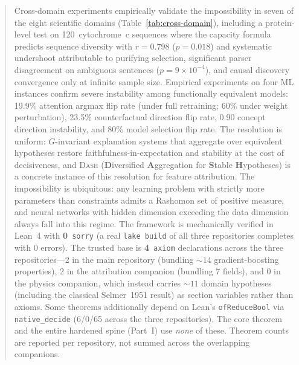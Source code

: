 \documentclass[11pt,a4paper]{article}
\newcommand{\DASH}{\textsc{Dash}}
\begin{document}
\begin{abstract}
Cross-domain experiments empirically validate the impossibility in seven of
the eight scientific domains (Table~\ref{tab:cross-domain}), including a
protein-level test on 120~cytochrome~c sequences where the capacity
formula predicts sequence diversity with $r = 0.798$ ($p = 0.018$) and
systematic undershoot attributable to purifying selection,
significant parser disagreement on ambiguous sentences
($p = 9 \times 10^{-4}$), and causal discovery convergence only at infinite
sample size.
Empirical experiments on four ML instances confirm severe instability among
functionally equivalent models: 19.9\% attention argmax flip rate
(under full retraining; 60\% under weight perturbation), 23.5\%
counterfactual direction flip rate, 0.90 concept direction instability,
and 80\% model selection flip rate.
The resolution is uniform: $G$-invariant explanation systems that aggregate
over equivalent hypotheses restore faithfulness-in-expectation and stability at
the cost of decisiveness, and \DASH{} (\textbf{D}iversified \textbf{A}ggregation for
\textbf{S}table \textbf{H}ypotheses) is a concrete instance of this resolution for feature attribution.
The impossibility is ubiquitous: any learning problem with strictly more
parameters than constraints admits a Rashomon set of positive measure, and
neural networks with hidden dimension exceeding the data dimension always fall
into this regime.
The framework is mechanically verified in Lean~4 with \textbf{0}~\texttt{sorry}
(a real \texttt{lake build} of all three repositories completes with 0 errors).
The trusted base is \textbf{4}~\texttt{axiom} declarations across the three
repositories---2 in the main repository (bundling ${\sim}14$ gradient-boosting
properties), 2 in the attribution companion (bundling 7 fields), and 0 in the physics
companion, which instead carries ${\sim}11$ domain hypotheses (including the classical
Selmer~1951 result) as section variables rather than axioms. Some theorems additionally
depend on Lean's \texttt{ofReduceBool} via \texttt{native\_decide} (6/0/65 across the
three repositories). The core theorem and the entire hardened spine (Part~I) use
\emph{none} of these. Theorem counts are reported per repository, not summed across the
overlapping companions.
\end{abstract}

\newpage
\tableofcontents
\newpage


\clearpage
\end{document}
